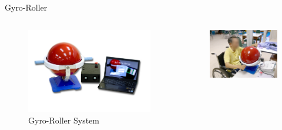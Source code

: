 \documentclass[10pt]{beamer}
\begin{document}
\begin{frame}{Gyro-Roller}
	\begin{columns}[c]
		\begin{figure}[h]
			\includegraphics[width=\textwidth]{gyrosys}
			\caption{Gyro-Roller System}
		\end{figure}
		\begin{figure}[h]
			\includegraphics[width=\textwidth]{patient1}
			\newline
			\break

\end{figure}
\end{columns}
\end{frame}
\end{document}

